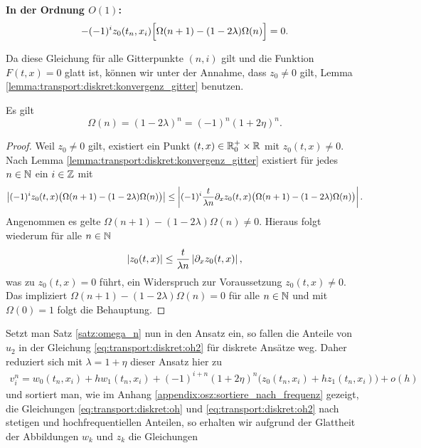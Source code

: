 \vspace{0.4cm}
\noindent \textbf{In der Ordnung $O(1)$:}
\begin{align}\label{eq:transport:osz:o1} %
- (-1)^i z_0(t_n, x_i) \Bigl[ \Omega(n+1) - ( 1 - 2 \lambda ) \Omega(n) \Bigr] = 0.
\end{align}

Da diese Gleichung für alle Gitterpunkte $(n,i)$ gilt und die Funktion $F(t,x) = 0$ glatt ist, können wir unter der Annahme, dass $z_0 \neq 0$ gilt, Lemma \ref{lemma:transport:diskret:konvergenz_gitter} benutzen.
\begin{satz}\label{satz:omega_n}
Es gilt
\[ \Omega(n) = (1 - 2 \lambda)^n = (-1)^n (1 + 2 \eta)^n. \]
\end{satz}
\begin{proof}
Weil $z_0 \neq 0$ gilt, existiert ein Punkt $(t,x) \in \mathbb R^+_0 \times \mathbb R$ mit $z_0(t,x) \neq 0$.
Nach Lemma \ref{lemma:transport:diskret:konvergenz_gitter} existiert für jedes $n \in \mathbb N$ ein $i \in \mathbb Z$ mit
\[  \left| (-1)^i z_0(t, x) \bigl( \Omega(n+1) - ( 1 - 2 \lambda ) \Omega(n) \bigr) \right| \leq \left| (-1)^i \frac {t}{\lambda n} \partial_x z_0(t, x) \bigl( \Omega(n+1) - ( 1 - 2 \lambda ) \Omega(n) \bigr) \right|. \]
Angenommen es gelte $\Omega(n+1) - ( 1 - 2 \lambda ) \Omega(n) \neq 0$.
Hieraus folgt wiederum für alle $n \in \mathbb N$
\[ \left| z_0(t, x) \right| \leq \frac {t}{\lambda n} \left| \partial_x z_0(t,x) \right|, \]
was zu $z_0(t,x) = 0$ führt, ein Widerspruch zur Voraussetzung $z_0(t,x) \neq 0$.
Das impliziert $\Omega(n+1) - ( 1 - 2 \lambda ) \Omega(n) = 0$ für alle $n \in \mathbb N$ und mit $\Omega(0) = 1$ folgt die Behauptung.
\end{proof}

Setzt man Satz \ref{satz:omega_n} nun in den Ansatz ein, so fallen die Anteile von $u_2$ in der Gleichung \eqref{eq:transport:diskret:oh2} für diskrete Ansätze weg.
Daher reduziert sich mit $\lambda = 1 + \eta$ dieser Ansatz hier zu
\begin{align}\label{eq:transport:osz:ansatz}
v^n_i = w_0(t_n, x_i) + h  w_1(t_n, x_i) + (-1)^{i+n} (1 + 2 \eta)^n \bigl( z_0(t_n, x_i) + h z_1(t_n, x_i) \bigr) + o(h)
\end{align}
und sortiert man, wie im Anhang \ref{appendix:osz:sortiere_nach_frequenz} gezeigt, die Gleichungen \eqref{eq:transport:diskret:oh} und \eqref{eq:transport:diskret:oh2} nach stetigen und hochfrequentiellen Anteilen, so erhalten wir aufgrund der Glattheit der Abbildungen $w_k$ und $z_k$ die Gleichungen

